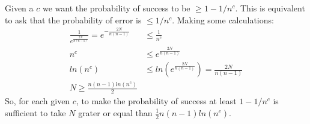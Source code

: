 \documentclass[a4paper]{article}
\begin{document}
Given a $c$ we want the probability of success to be $\geq 1 - 1/n^c$.
This is equivalent to ask that the probability of error is $\leq 1/n^c$.
Making some calculations:
\begin{align*}
\frac{1}{e^{\frac{2N}{n(n-1)}}} = e^{-\frac{2N}{n(n-1)}} &\leq \frac{1}{n^c}\\
n^c &\leq e^{\frac{2N}{n(n-1)}}\\
ln(n^c) &\leq ln(e^{\frac{2N}{n(n-1)}}) = \frac{2N}{n(n-1)}\\
N \geq \frac{n(n-1)ln(n^c)}{2}
\end{align*}
So, for each given $c$, to make the probability of success at least $1 - 1/n^c$ is sufficient to take $N$ grater or equal than $\frac{1}{2} n(n-1)ln(n^c)$.
\end{document}
